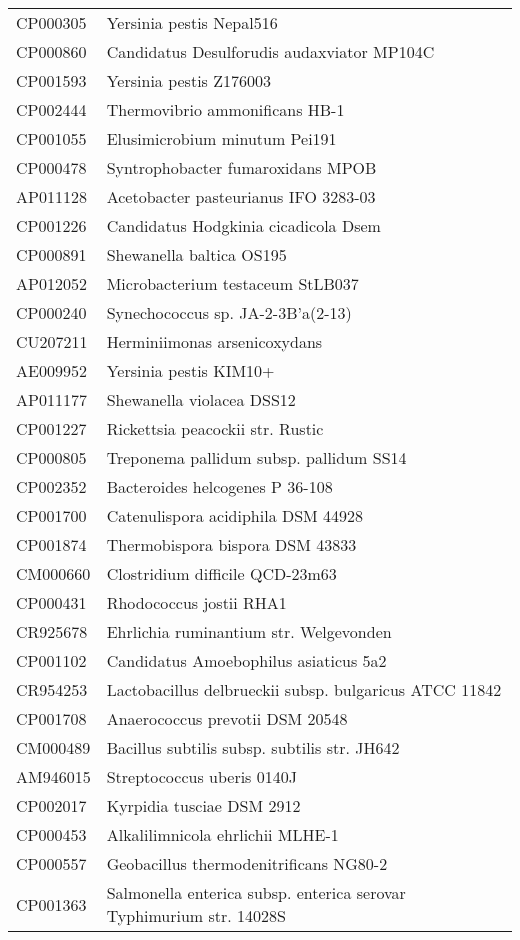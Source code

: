 \begin{longtable}{ll}
CP000305 & Yersinia pestis Nepal516\\
CP000860 & Candidatus Desulforudis audaxviator MP104C\\
CP001593 & Yersinia pestis Z176003\\
CP002444 & Thermovibrio ammonificans HB-1\\
CP001055 & Elusimicrobium minutum Pei191\\
CP000478 & Syntrophobacter fumaroxidans MPOB\\
AP011128 & Acetobacter pasteurianus IFO 3283-03\\
CP001226 & Candidatus Hodgkinia cicadicola Dsem\\
CP000891 & Shewanella baltica OS195\\
AP012052 & Microbacterium testaceum StLB037\\
CP000240 & Synechococcus sp. JA-2-3B'a(2-13)\\
CU207211 & Herminiimonas arsenicoxydans\\
AE009952 & Yersinia pestis KIM10+\\
AP011177 & Shewanella violacea DSS12\\
CP001227 & Rickettsia peacockii str. Rustic\\
CP000805 & Treponema pallidum subsp. pallidum SS14\\
CP002352 & Bacteroides helcogenes P 36-108\\
CP001700 & Catenulispora acidiphila DSM 44928\\
CP001874 & Thermobispora bispora DSM 43833\\
CM000660 & Clostridium difficile QCD-23m63\\
CP000431 & Rhodococcus jostii RHA1\\
CR925678 & Ehrlichia ruminantium str. Welgevonden\\
CP001102 & Candidatus Amoebophilus asiaticus 5a2\\
CR954253 & Lactobacillus delbrueckii subsp. bulgaricus ATCC 11842\\
CP001708 & Anaerococcus prevotii DSM 20548\\
CM000489 & Bacillus subtilis subsp. subtilis str. JH642\\
AM946015 & Streptococcus uberis 0140J\\
CP002017 & Kyrpidia tusciae DSM 2912\\
CP000453 & Alkalilimnicola ehrlichii MLHE-1\\
CP000557 & Geobacillus thermodenitrificans NG80-2\\
CP001363 & Salmonella enterica subsp. enterica serovar Typhimurium str. 14028S\\

\end{longtable}
